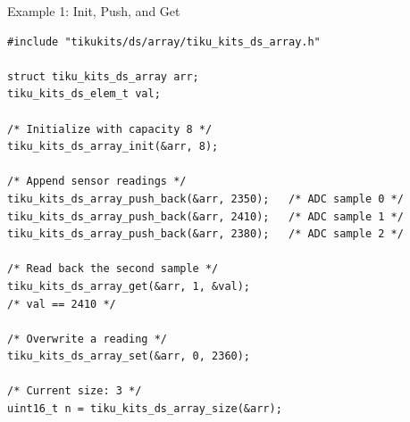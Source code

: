 \documentclass[aspectratio=169, 10pt]{beamer}
\begin{document}
\begin{frame}[fragile]{Example 1: Init, Push, and Get}
\begin{lstlisting}[style=cstyle,
  title={Basic array usage --- init, push\_back, get}]
#include "tikukits/ds/array/tiku_kits_ds_array.h"

struct tiku_kits_ds_array arr;
tiku_kits_ds_elem_t val;

/* Initialize with capacity 8 */
tiku_kits_ds_array_init(&arr, 8);

/* Append sensor readings */
tiku_kits_ds_array_push_back(&arr, 2350);   /* ADC sample 0 */
tiku_kits_ds_array_push_back(&arr, 2410);   /* ADC sample 1 */
tiku_kits_ds_array_push_back(&arr, 2380);   /* ADC sample 2 */

/* Read back the second sample */
tiku_kits_ds_array_get(&arr, 1, &val);
/* val == 2410 */

/* Overwrite a reading */
tiku_kits_ds_array_set(&arr, 0, 2360);

/* Current size: 3 */
uint16_t n = tiku_kits_ds_array_size(&arr);
\end{lstlisting}
\end{frame}
\end{document}
